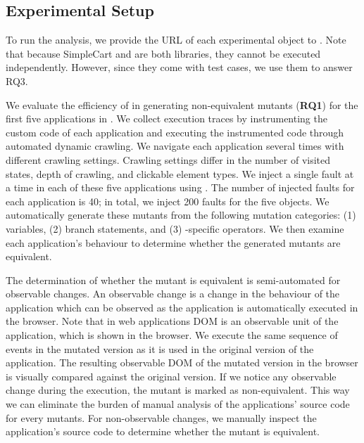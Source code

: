  


\subsection{Experimental Setup}
To run the analysis, we provide the URL of each experimental object to \mutandis. 
Note that because SimpleCart and \jquery are both \javascript libraries, they cannot be executed independently. However, since they come with test cases, we use them to answer RQ3.

We evaluate the efficiency of \mutandis in generating non-equivalent mutants (\textbf{RQ1}) for the first five applications in . 
We collect execution traces by instrumenting the custom \javascript code of each application and executing the instrumented code through automated dynamic crawling. 
We navigate each application several times with different crawling settings. Crawling settings differ in the number of visited states, depth of crawling, and clickable element types.
We inject a single fault at a time in each of these five applications using \mutandis. The number of injected faults for each application is 40; in total, we inject 200 faults for the five objects. We automatically generate these mutants from the following mutation categories: (1) variables, (2) branch statements, and (3) \javascript-specific operators. We then examine each application's behaviour to determine whether the generated mutants are equivalent.  

The determination of whether the mutant is equivalent is semi-automated for observable changes.
An observable change is a change in the behaviour of the application which can be observed as the application is automatically executed in the browser.
Note that in web applications DOM is an observable unit of the application, which is shown in the browser. We execute the same sequence of events in the mutated version as it is used in the original version of the application. The resulting observable DOM of the mutated version in the browser is visually compared against the original version. 
If we notice any observable change during the execution, the mutant is marked as non-equivalent. 
This way we can eliminate the burden of manual analysis of the applications' source code for every mutants.  
For non-observable changes, we manually inspect the application's source code to determine whether the mutant is equivalent.

